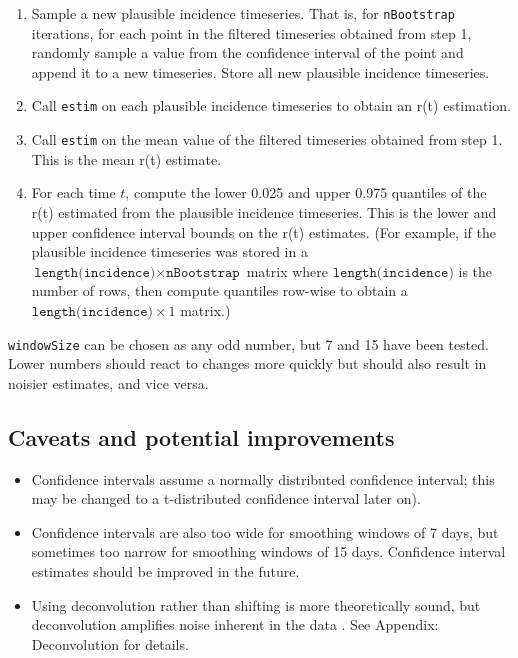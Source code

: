 \documentclass{article}
\newcommand{\code}[1]{\texttt{#1}}
\begin{document}
{\begin{enumerate}
	\item Sample a new plausible incidence timeseries. That is, for \code{nBootstrap} iterations, for each point in the filtered timeseries obtained from step 1, randomly sample a value from the confidence interval of the point and append it to a new timeseries. Store all new plausible incidence timeseries.
	
	\item Call \code{estim} on each plausible incidence timeseries to obtain an r(t) estimation. 
	
	\item Call \code{estim} on the mean value of the filtered timeseries obtained from step 1. This is the mean r(t) estimate.
	
	\item For each time $t$, compute the lower 0.025 and upper 0.975 quantiles of the r(t) estimated from the plausible incidence timeseries. This is the lower and upper confidence interval bounds on the r(t) estimates. (For example, if the plausible incidence timeseries was stored in a $\code{length(incidence)} \times \code{nBootstrap}$ matrix where $\code{length(incidence)}$ is the number of rows, then compute quantiles row-wise to obtain a $\code{length(incidence)} \times 1$ matrix.) 
\end{enumerate}

\code{windowSize} can be chosen as any odd number, but 7 and 15 have been tested. Lower numbers should react to changes more quickly but should also result in noisier estimates, and vice versa.

\subsection{Caveats and potential improvements}
\begin{itemize}
	\item Confidence intervals assume a normally distributed confidence interval; this may be changed to a t-distributed confidence interval later on). 
	\item Confidence intervals are also too wide for smoothing windows of 7 days, but sometimes too narrow for smoothing windows of 15 days. Confidence interval estimates should be improved in the future.
	\item Using deconvolution rather than shifting is more theoretically sound, but deconvolution amplifies noise inherent in the data \cite{Gostic} \cite{RLLoss}. See Appendix: Deconvolution for details.
\end{itemize}

}
\end{document}
